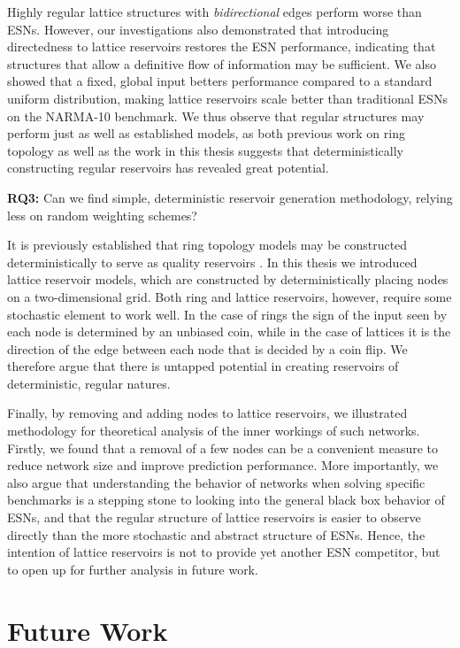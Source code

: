 Highly regular lattice structures with \textit{bidirectional} edges perform
worse than ESNs. However, our investigations also demonstrated that introducing
directedness to lattice reservoirs restores the ESN performance, indicating that
structures that allow a definitive flow of information may be sufficient. We
also showed that a fixed, global input betters performance compared to a
standard uniform distribution, making lattice reservoirs scale better than
traditional ESNs on the NARMA-10 benchmark. We thus observe that regular
structures may perform just as well as established models, as both previous work
on ring topology as well as the work in this thesis suggests that
deterministically constructing regular reservoirs has revealed great potential.

\textbf{RQ3:} Can we find simple, deterministic reservoir generation
methodology, relying less on random weighting schemes?

It is previously established that ring topology models may be constructed
deterministically to serve as quality reservoirs \cite{rodan_minimum_2011}. In
this thesis we introduced lattice reservoir models, which are constructed by
deterministically placing nodes on a two-dimensional grid. Both ring and lattice
reservoirs, however, require some stochastic element to work well. In the case
of rings the sign of the input seen by each node is determined by an unbiased
coin, while in the case of lattices it is the direction of the edge between each
node that is decided by a coin flip. We therefore argue that there is untapped
potential in creating reservoirs of deterministic, regular natures.

Finally, by removing and adding nodes to lattice reservoirs, we illustrated
methodology for theoretical analysis of the inner workings of such
networks. Firstly, we found that a removal of a few nodes can be a convenient
measure to reduce network size and improve prediction performance. More
importantly, we also argue that understanding the behavior of networks when
solving specific benchmarks is a stepping stone to looking into the general
black box behavior of ESNs, and that the regular structure of lattice reservoirs
is easier to observe directly than the more stochastic and abstract structure of
ESNs. Hence, the intention of lattice reservoirs is not to provide yet another
ESN competitor, but to open up for further analysis in future work.

\section{Future Work}

